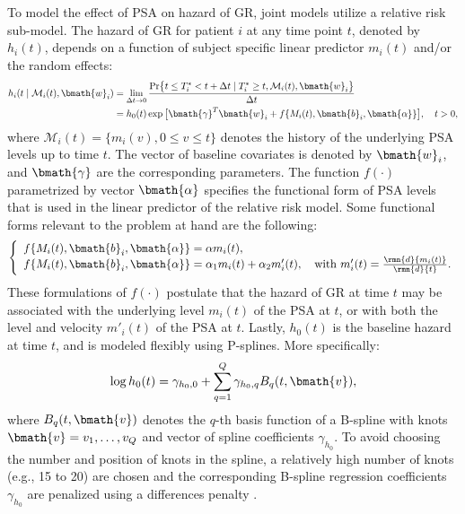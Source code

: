 To model the effect of PSA on hazard of GR, joint models utilize a relative risk sub-model. The hazard of GR for patient $i$ at any time point $t$, denoted by $h_i(t)$, depends on a function of subject specific linear predictor $m_i(t)$ and/or the random effects:
\begin{align*}
h_i(t \mid \mathcal{M}_i(t), \bmath{w}_i) &= \lim_{\Delta t \to 0} \frac{\mbox{Pr}\big\{t \leq T^*_i < t + \Delta t \mid T^*_i \geq t, \mathcal{M}_i(t), \bmath{w}_i\big\}}{\Delta t}\\
&=h_0(t) \exp\big[\bmath{\gamma}^T\bmath{w}_i + f\{M_i(t), \bmath{b}_i, \bmath{\alpha}\}\big], \quad t>0,
\end{align*}
where $\mathcal{M}_i(t) = \{m_i(v), 0\leq v \leq t\}$ denotes the history of the underlying PSA levels up to time $t$. The vector of baseline covariates is denoted by $\bmath{w}_i$, and $\bmath{\gamma}$ are the corresponding parameters. The function $f(\cdot)$ parametrized by vector $\bmath{\alpha}$ specifies the functional form of PSA levels \citep{brown2009assessing,rizopoulos2012joint,taylor2013real,rizopoulos2014bma} that is used in the linear predictor of the relative risk model. Some functional forms relevant to the problem at hand are the following: 
\begin{eqnarray*}
\left \{
\begin{array}{l}
f\{M_i(t), \bmath{b}_i, \bmath{\alpha}\} = \alpha m_i(t),\\
f\{M_i(t), \bmath{b}_i, \bmath{\alpha}\} = \alpha_1 m_i(t) + \alpha_2 m'_i(t),\quad \text{with}\  m'_i(t) = \frac{\rmn{d}{m_i(t)}}{\rmn{d}{t}}.\\
\end{array}
\right.
\end{eqnarray*}
These formulations of $f(\cdot)$ postulate that the hazard of GR at time $t$ may be associated with the underlying level $m_i(t)$ of the PSA at $t$, or with both the level and velocity $m'_i(t)$ of the PSA at $t$. Lastly, $h_0(t)$ is the baseline hazard at time $t$, and is modeled flexibly using P-splines. More specifically:
\begin{equation*}
\log{h_0(t)} = \gamma_{h_0,0} + \sum_{q=1}^Q \gamma_{h_0,q} B_q(t, \bmath{v}),
\end{equation*}
where $B_q(t, \bmath{v})$ denotes the $q$-th basis function of a B-spline with knots $\bmath{v} = v_1, \ldots, v_Q$ and vector of spline coefficients $\gamma_{h_0}$. To avoid choosing the number and position of knots in the spline, a relatively high number of knots (e.g., 15 to 20) are chosen and the corresponding B-spline regression coefficients $\gamma_{h_0}$ are penalized using a differences penalty \citep{eilers1996flexible}. 

